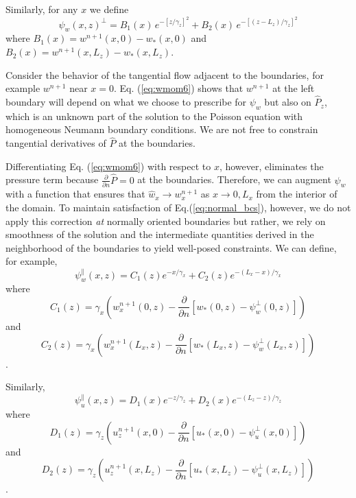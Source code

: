 \documentclass{jfm-like}
\begin{document}
Similarly, for any $x$ we define
\begin{equation}
\psi_w(x,z)^{\perp} = B_1(x) \, e^{-[z/\gamma_z]^2} +  B_2(x) \, e^{-[(z-L_z)/\gamma_z]^2} 
\label{eq:wstar_normal_correction}
\end{equation}
where $B_1(x) = w^{n+1}(x,0) - w_*(x,0) $ and $B_2(x) = w^{n+1}(x,L_z) - w_*(x,L_z)$.

\vspace{14pt}
Consider the behavior of the tangential flow adjacent to the boundaries, for example $w^{n+1}$ near $x=0$. Eq. (\ref{eq:wmom6}) shows that $w^{n+1}$ at the left boundary will depend
on what we choose to prescribe for $\psi_w$ but also on ${\hat P}_z$, which is an unknown part of the solution to the Poisson equation with homogeneous Neumann boundary conditions. We are not free to constrain
tangential derivatives of ${\hat P}$ at the boundaries. 

Differentiating Eq. (\ref{eq:wmom6}) with respect to $x$, however, eliminates the pressure term because $\frac{\partial}{\partial n}{\hat P} = 0$ at the boundaries. Therefore, we can augment $\psi_w$ with
a  function that ensures that ${\hat w}_x \to w_x^{n+1}$ as $x \to 0,L_x$ from the interior of the domain. To maintain satisfaction of Eq.(\ref{eq:normal_bcs}), however, we do not apply this correction {\em at} normally oriented boundaries
but rather, we rely on smoothness of the solution and the intermediate quantities derived in the neighborhood of the boundaries to yield well-posed constraints. 
We can define, for example,
\begin{equation}
\psi^{\parallel}_w(x,z) = C_1(z) e^{-x/\gamma_x} + C_2(z) e^{-(L_x-x)/\gamma_x}
\end{equation}
where $$C_1(z) = \gamma_x \left( w_x^{n+1}(0,z) - \frac{\partial}{\partial n} \left[ w_*(0,z) - \psi^{\perp}_w(0,z) \right] \right )$$ and
 $$C_2(z) = \gamma_x \left( w_x^{n+1}(L_x,z) - \frac{\partial}{\partial n} \left[ w_*(L_x,z) - \psi^{\perp}_w(L_x,z) \right] \right) $$.
 
 Similarly, 
\begin{equation}
\psi^{\parallel}_u(x,z) = D_1(x) e^{-z/\gamma_z} + D_2(x) e^{-(L_z-z)/\gamma_z}
\label{eq:psipar}
\end{equation}
where $$D_1(z) = \gamma_z \left( u_z^{n+1}(x,0) - \frac{\partial}{\partial n} \left[ u_*(x,0) - \psi^{\perp}_u(x,0) \right] \right )$$ and
 $$D_2(z) = \gamma_z \left( u_z^{n+1}(x,L_z) - \frac{\partial}{\partial n} \left[ u_*(x,L_z) - \psi^{\perp}_u(x,L_z) \right] \right) $$.
\end{document}
